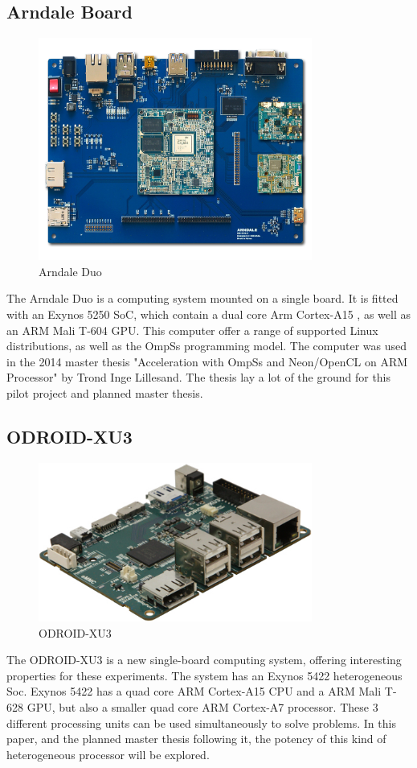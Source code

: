\subsection{Arndale Board} \label{ArendaleBoard}
\begin{figure}[ht!]
  \centering
  \includegraphics[width=90mm]{fig/Arendale.jpg}
  \caption{Arndale Duo \label{overflow}}
\end{figure}
The Arndale Duo is a computing system mounted on a single board.
It is fitted with an Exynos 5250 SoC, which contain a dual core Arm Cortex-A15 , as well as an ARM Mali T-604 GPU.
This computer offer a range of supported Linux distributions, as well as the OmpSs programming model.
The computer was used in the 2014 master thesis "Acceleration with OmpSs and Neon/OpenCL on ARM Processor" by Trond Inge Lillesand.
The thesis lay a lot of the ground for this pilot project and planned master thesis.

\subsection{ODROID-XU3} \label{OdroidXU3}
\begin{figure}[ht!]
  \centering
  \includegraphics[width=90mm]{fig/ODROID.jpg}
  \caption{ODROID-XU3 \label{overflow}}
\end{figure}
The ODROID-XU3 is a new single-board computing system, offering interesting properties for these experiments.
The system has an Exynos 5422 heterogeneous Soc.
Exynos 5422 has a quad core ARM Cortex-A15 CPU and a ARM Mali T-628 GPU, but also a smaller quad core ARM Cortex-A7 processor.
These 3 different processing units can be used simultaneously to solve problems.
In this paper, and the planned master thesis following it, the potency of this kind of heterogeneous processor will be explored.


